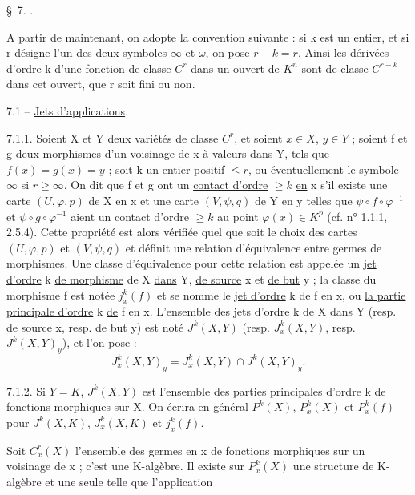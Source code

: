 
\S\ 7. .

A partir de maintenant, on adopte la convention suivante : si k est un entier, et si r désigne l'un des deux symboles $\infty$ et $\omega$, on pose $r-k=r$. Ainsi les dérivées d'ordre k d'une fonction de classe $C^r$ dans un ouvert de $K^n$ sont de classe $C^{r-k}$ dans cet ouvert, que r soit fini ou non.

7.1 -- \uline{Jets d'applications}.

7.1.1. Soient X et Y deux variétés de classe $C^r$, et soient $x\in X$, $y\in Y$ ; soient f et g deux morphismes d'un voisinage de x à valeurs dans Y, tels que $f(x)=g(x)=y$ ; soit k un entier positif $\leq r$, ou éventuellement le symbole $\infty$ si $r\geq\infty$. On dit que f et g ont un \uline{contact d'ordre} $\geq k$ \uline{en} x s'il existe une carte $(U,\varphi,p)$ de X en x et une carte $(V,\psi,q)$ de Y en y telles que $\psi\circ f\circ\varphi^{-1}$ et $\psi\circ g\circ\varphi^{-1}$ aient un contact d'ordre $\geq k$ au point $\varphi(x)\in K^p$ (cf. n° 1.1.1, 2.5.4). Cette propriété est alors vérifiée quel que soit le choix des cartes $(U,\varphi,p)$ et $(V,\psi,q)$ et définit une relation d'équivalence entre germes de morphismes. Une classe d'équivalence pour cette relation est appelée un \uline{jet d'ordre} k \uline{de morphisme} de X \uline{dans} Y, \uline{de source} x et \uline{de but} y ; la classe du morphisme f est notée $j_x^k(f)$ et se nomme le \uline{jet d'ordre} k de f en x, ou \uline{la partie principale d'ordre} k \uline{de} f en x. L'ensemble des jets d'ordre k de X dans Y (resp. de source x, resp. de but y) est noté $J^k(X,Y)$ (resp. $J_x^k(X,Y)$, resp. $J^k(X,Y)_y$), et l'on pose :
\[
J_x^k(X,Y)_y=J_x^k(X,Y)\cap J^k(X,Y)_y.
\]

7.1.2. Si $Y=K$, $J^k(X,Y)$ est l'ensemble des parties principales d'ordre k de fonctions morphiques sur X. On écrira en général $P^k(X)$, $P_x^k(X)$ et $P_x^k(f)$ pour $J^k(X,K)$, $J_x^k(X,K)$ et $j_x^k(f)$.

Soit $C_x^r(X)$ l'ensemble des germes en x de fonctions morphiques sur un voisinage de x ; c'est une K-algèbre. Il existe sur $P_x^k(X)$ une structure de K-algèbre et une seule telle que l'application

